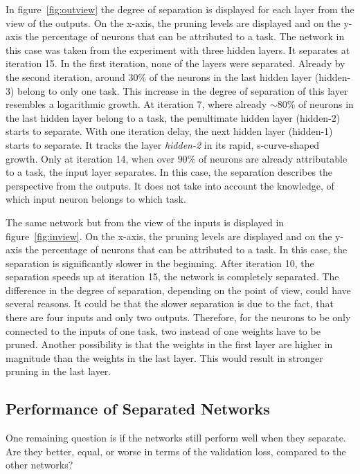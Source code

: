In figure~\ref{fig:outview} the degree of separation is displayed for each layer from the view of the outputs.
On the x-axis, the pruning levels are displayed and on the y-axis the percentage of neurons that can be attributed to a task.
The network in this case was taken from the experiment with three hidden layers.
It separates at iteration 15.
In the first iteration, none of the layers were separated.
Already by the second iteration, around $30$\% of the neurons in the last hidden layer (hidden-3) belong to only one task.
This increase in the degree of separation of this layer resembles a logarithmic growth.
At iteration 7, where already $\sim80$\% of neurons in the last hidden layer belong to a task, the penultimate hidden layer (hidden-2) starts to separate.
With one iteration delay, the next hidden layer (hidden-1) starts to separate.
It tracks the layer \textit{hidden-2} in its rapid, s-curve-shaped growth.
Only at iteration 14, when over $90$\% of neurons are already attributable to a task, the input layer separates.
In this case, the separation describes the perspective from the outputs.
It does not take into account the knowledge, of which input neuron belongs to which task.

The same network but from the view of the inputs is displayed in figure~\ref{fig:inview}.
On the x-axis, the pruning levels are displayed and on the y-axis the percentage of neurons that can be attributed to a task.
In this case, the separation is significantly slower in the beginning.
After iteration 10, the separation speeds up at iteration 15, the network is completely separated.
The difference in the degree of separation, depending on the point of view, could have several reasons.
It could be that the slower separation is due to the fact, that there are four inputs and only two outputs.
Therefore, for the neurons to be only connected to the inputs of one task, two instead of one weights have to be pruned.
Another possibility is that the weights in the first layer are higher in magnitude than the weights in the last layer.
This would result in stronger pruning in the last layer.

\subsection{Performance of Separated Networks}
One remaining question is if the networks still perform well when they separate.
Are they better, equal, or worse in terms of the validation loss, compared to the other networks?

